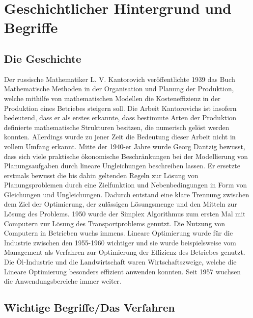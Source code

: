 \section{Geschichtlicher Hintergrund und Begriffe}
\subsection{Die Geschichte}
Der russische Mathematiker L. V. Kantorovich veröffentlichte 1939 das Buch Mathematische Methoden in der Organisation und Planung der Produktion, welche mithilfe von mathematischen Modellen die Kosteneffizienz in der Produktion eines Betriebes steigern soll. Die Arbeit Kantorovichs ist insofern bedeutend, dass er als erstes erkannte, dass bestimmte Arten der Produktion definierte mathematische Strukturen besitzen, die numerisch gelöst werden konnten. Allerdings wurde zu jener Zeit die Bedeutung dieser Arbeit nicht in vollem Umfang erkannt. Mitte der 1940-er Jahre wurde Georg Dantzig bewusst, dass sich viele praktische ökonomische Beschränkungen bei der Modellierung von Planungsaufgaben durch lineare Ungleichungen beschreiben lassen. Er ersetzte erstmals bewusst die bis dahin geltenden Regeln zur Lösung von Planungsproblemen durch eine Zielfunktion und Nebenbedingungen in Form von Gleichungen und Ungleichungen. Dadurch entstand eine klare Trennung zwischen dem Ziel der Optimierung, der zulässigen Lösungsmenge und den Mitteln zur Lösung des Problems.  1950 wurde der Simplex Algorithmus zum ersten Mal mit Computern zur Lösung des Transportproblems genutzt. Die Nutzung von Computern in Betrieben wuchs immens. Lineare Optimierung wurde für die Industrie zwischen den 1955-1960 wichtiger und sie wurde beispielsweise vom Management als Verfahren zur Optimierung der Effizienz des Betriebes genutzt. Die Öl-Industrie und die Landwirtschaft waren Wirtschaftszweige, welche die Lineare Optimierung besonders effizient anwenden konnten. Seit 1957 wuchsen die Anwendungsbereiche immer weiter. 
\\
\subsection{Wichtige Begriffe/Das Verfahren}

